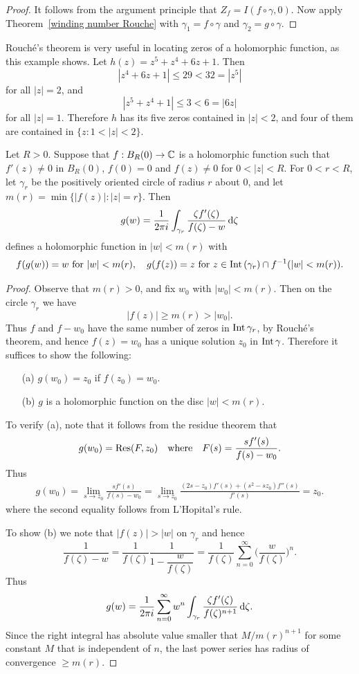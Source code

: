 \begin{proof}
It follows from the argument principle that $Z_f=I(f\circ\gamma,0)$. Now apply Theorem~\ref{winding number Rouche} with $\gamma_1=f\circ\gamma$ and $\gamma_2=g\circ\gamma$.
\end{proof}
\begin{example}
Rouch\'e's theorem is very useful in locating zeros of a holomorphic function, as this example shows. Let $h(z)=z^5+z^4+6z+1$. Then
\[|z^4+6z+1|\leq 29<32=|z^5|\]
for all $|z|=2$, and
\[|z^5+z^4+1|\leq 3<6=|6z|\]
for all $|z|=1$. Therefore $h$ has its five zeros contained in $|z|<2$, and four of them are contained in $\{z:1<|z|<2\}$.
\end{example}
\begin{theorem}
Let $R>0$. Suppose that $f:B_R(0)\to\mathbb{C}$ is a holomorphic function such that $f'(z)\neq 0$ in $B_R(0)$, $f(0)=0$ and $f(z)\neq 0$ for $0<|z|<R$. For $0<r<R$, let $\gamma_r$ be the positively oriented circle of radius $r$ about $0$, and let $m(r)=\min\{|f(z)|:|z|=r\}$. Then
\[g(w)=\frac{1}{2\pi i}\int_{\gamma_r}\frac{\zeta f'(\zeta)}{f(\zeta)-w}\mathop{}\!\mathrm{d}\zeta\]
defines a holomorphic function in $|w|<m(r)$ with
\[f(g(w))=w\text{ for }|w|<m(r),\quad g(f(z))=z\text{ for }z\in\mathrm{Int}\,(\gamma_r)\cap f^{-1}(|w|<m(r)).\]
\end{theorem}
\begin{proof}
Observe that $m(r)>0$, and fix $w_0$ with $|w_0|<m(r)$. Then on the circle $\gamma_r$ we have
\[|f(z)|\geq m(r)>|w_0|.\]
Thus $f$ and $f-w_0$ have the same number of zeros in $\mathrm{Int}\,\gamma_r$, by Rouch\'e's theorem, and hence $f(z)=w_0$ has a unique solution $z_0$ in $\mathrm{Int}\,\gamma$. Therefore it suffices to show the following:
\begin{itemize}
\item[(a)] $g(w_0)=z_0$ if $f(z_0)=w_0$.
\item[(b)] $g$ is a holomorphic function on the disc $|w|<m(r)$.
\end{itemize}
To verify (a), note that it follows from the residue theorem that
\[g(w_0)=\mathrm{Res}(F,z_0)\quad\text{where}\quad F(s)=\frac{sf'(s)}{f(s)-w_0}.\]
Thus
\begin{align*}
g(w_0)=\lim_{s\to z_0}\frac{sf'(s)}{f(s)-w_0}=\lim_{s\to z_0}\frac{(2s-z_0)f'(s)+(s^2-sz_0)f''(s)}{f'(s)}=z_0.
\end{align*}
where the second equality follows from L'Hopital's rule.\par
To show (b) we note that $|f(z)|>|w|$ on $\gamma_r$ and hence
\[\frac{1}{f(\zeta)-w}=\frac{1}{f(\zeta)}\frac{1}{1-\dfrac{w}{f(\zeta)}}=\frac{1}{f(\zeta)}\sum_{n=0}^{\infty}\Big(\frac{w}{f(\zeta)}\Big)^n.\]
Thus
\[g(w)=\frac{1}{2\pi i}\sum_{n=0}^{\infty}w^n\int_{\gamma_r}\frac{\zeta f'(\zeta)}{f(\zeta)^{n+1}}\mathop{}\!\mathrm{d}\zeta.\]
Since the right integral has absolute value smaller that $M/m(r)^{n+1}$ for some constant $M$ that is independent of $n$, the last power series has radius of convergence $\geq m(r)$.
\end{proof}
